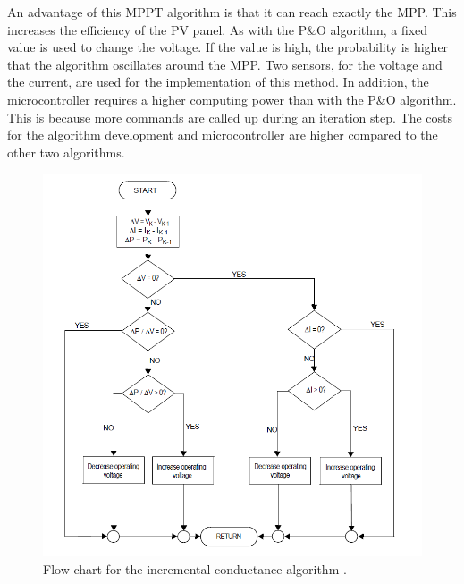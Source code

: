 An advantage of this MPPT algorithm is that it can reach exactly the MPP. This increases the efficiency of the PV panel. As with the P\&O algorithm, a fixed value is used to change the voltage. If the value is high, the probability is higher that the algorithm oscillates around the MPP. 
Two sensors, for the voltage and the current, are used for the implementation of this method. In addition, the microcontroller requires a higher computing power than with the P\&O algorithm. This is because more commands are called up during an iteration step. The costs for the algorithm development and microcontroller are higher compared to the other two algorithms. \cite{AN1521_MC}

\begin{figure}[H]
	\begin{center}
		\includegraphics[width=1\textwidth]{../Pictures/P1/Flow_chart/flow_chart_incremental_conductance}
		\caption{Flow chart for the incremental conductance algorithm \cite{AN1521_MC}.}
		\label{fcinccon}
	\end{center}	
\end{figure}


